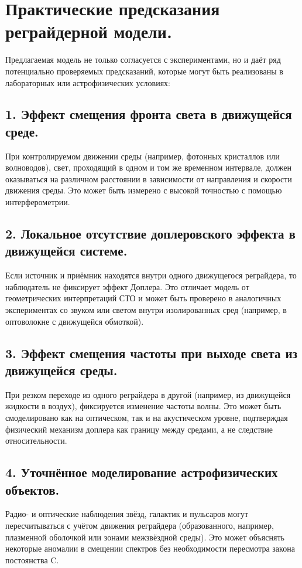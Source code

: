\documentclass[12pt]{article}
\begin{document}
\section*{Практические предсказания реграйдерной модели.}

Предлагаемая модель не только согласуется с экспериментами, но и даёт ряд потенциально проверяемых предсказаний, которые могут быть реализованы в лабораторных или астрофизических условиях:

\subsection*{1. Эффект смещения фронта света в движущейся среде.}
При контролируемом движении среды (например, фотонных кристаллов или волноводов), свет, проходящий в одном и том же временном интервале, должен оказываться на различном расстоянии в зависимости от направления и скорости движения среды. Это может быть измерено с высокой точностью с помощью интерферометрии.

\subsection*{2. Локальное отсутствие доплеровского эффекта в движущейся системе.}
Если источник и приёмник находятся внутри одного движущегося реграйдера, то наблюдатель не фиксирует эффект Доплера. Это отличает модель от геометрических интерпретаций СТО и может быть проверено в аналогичных экспериментах со звуком или светом внутри изолированных сред (например, в оптоволокне с движущейся обмоткой).

\subsection*{3. Эффект смещения частоты при выходе света из движущейся среды.}
При резком переходе из одного реграйдера в другой (например, из движущейся жидкости в воздух), фиксируется изменение частоты волны. Это может быть смоделировано как на оптическом, так и на акустическом уровне, подтверждая физический механизм доплера как границу между средами, а не следствие относительности.

\subsection*{4. Уточнённое моделирование астрофизических объектов.}
Радио- и оптические наблюдения звёзд, галактик и пульсаров могут пересчитываться с учётом движения реграйдера (образованного, например, плазменной оболочкой или зонами межзвёздной среды). Это может объяснять некоторые аномалии в смещении спектров без необходимости пересмотра закона постоянства C.
\end{document}
